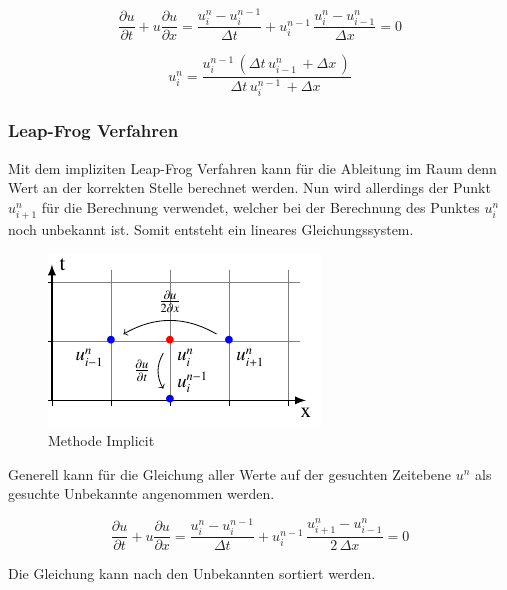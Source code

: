 	\begin{equation}
	\frac {\partial u}{\partial t}+u{\frac {\partial u}{\partial x}} = \frac{u_{i}^{n}-u_{i}^{n-1}}{\Delta t}+ u_{i}^{n-1}\, \frac{u_{i}^{n}-u_{i-1}^{n}}{\Delta x}=0
	\end{equation}
	
	\begin{equation}
	 u_{i}^{n} = \frac{u^{n-1}_{i}\, \left(\Delta{t}\, u^{n}_{i-1}\, + \Delta{x}\,\right)}{\Delta{t}\, u^{n-1}_{i}\, + \Delta{x}\,}
	\end{equation}




\subsubsection{Leap-Frog Verfahren}

	Mit dem impliziten Leap-Frog Verfahren kann f\"ur die Ableitung im Raum denn Wert an der korrekten Stelle berechnet werden.
	Nun wird allerdings der Punkt  $u_{i+1}^{n}$ f\"ur die Berechnung verwendet, welcher bei der Berechnung des Punktes  $u_{i}^{n}$ noch unbekannt ist.
	Somit entsteht ein lineares Gleichungssystem.

     \begin{figure}
	\centering
	\includegraphics[height=.4\textwidth]{papers/burgers/BurgersEquation/tikz/implicit/implicit.pdf}
	\caption{Methode Implicit}
	\label{burgers:fig:Implicit}
\end{figure}

Generell kann f\"ur die Gleichung aller Werte auf der gesuchten Zeitebene $u^n$ als gesuchte Unbekannte angenommen werden.

\begin{equation}
\frac {\partial u}{\partial t}+u{\frac {\partial u}{\partial x}} = \frac{u_{i}^{n}-u_{i}^{n-1}}{\Delta t}+ u_{i}^{n-1}\, \frac{u_{i+1}^{n}-u_{i-1}^{n}}{2\,\Delta x}=0
\end{equation}

Die Gleichung kann nach den Unbekannten sortiert werden.

